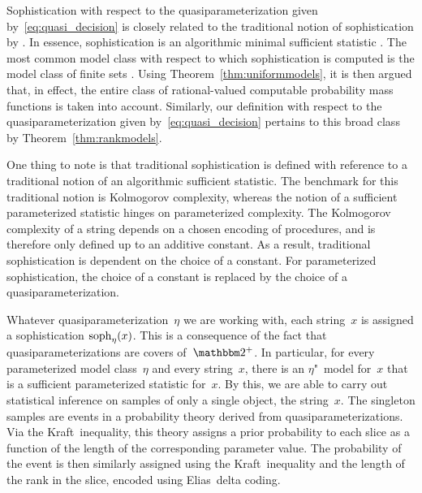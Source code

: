 \begin{example}[continued]
  Sophistication with respect to the quasiparameterization given by~\eqref{eq:quasi_decision} is closely related to the traditional notion of sophistication by \textcite{koppel1988structure}.
  In essence, sophistication is an algorithmic minimal sufficient statistic \parencite{vereshchagin2004kolmogorov}.
  The most common model class with respect to which sophistication is computed is the model class of finite sets \parencite{bloem2015two}.
  Using Theorem~\ref{thm:uniformmodels}, it is then argued that, in effect, the entire class of rational-valued computable probability mass functions is taken into account.
  Similarly, our definition with respect to the quasiparameterization given by~\eqref{eq:quasi_decision} pertains to this broad class by Theorem~\ref{thm:rankmodels}.

  One thing to note is that traditional sophistication is defined with reference to a traditional notion of an algorithmic sufficient statistic.
  The benchmark for this traditional notion is Kolmogorov complexity, whereas the notion of a sufficient parameterized statistic hinges on parameterized complexity.
  The Kolmogorov complexity of a string depends on a chosen encoding of procedures, and is therefore only defined up to an additive constant.
  As a result, traditional sophistication is dependent on the choice of a constant.
  For parameterized sophistication, the choice of a constant is replaced by the choice of a quasiparameterization.
\end{example}

Whatever quasiparameterization~$\eta$ we are working with, each string~$x$ is assigned a sophistication $\operatorname{soph}_\eta(x)$.
This is a consequence of the fact that quasiparameterizations are covers of~$\binary^+$.
In particular, for every parameterized model class~$\eta$ and every string~$x$, there is an $\eta$"~model for~$x$ that is a sufficient parameterized statistic for~$x$.
By this, we are able to carry out statistical inference on samples of only a single object, the string~$x$.
The singleton samples are events in a probability theory derived from quasiparameterizations.
Via the Kraft~inequality, this theory assigns a prior probability to each slice as a function of the length of the corresponding parameter value.
The probability of the event is then similarly assigned using the Kraft~inequality and the length of the rank in the slice, encoded using Elias~delta coding.

